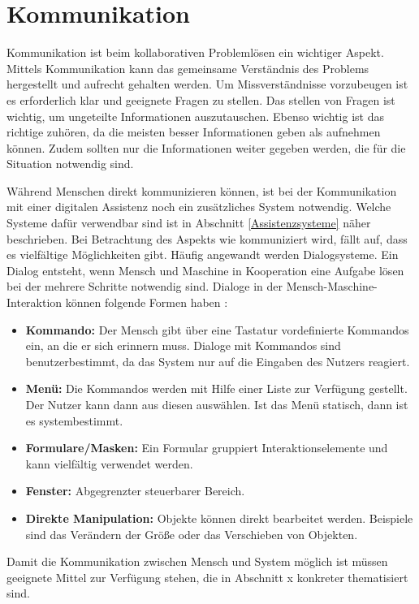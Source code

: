 \section{Kommunikation}
Kommunikation ist beim kollaborativen Problemlösen ein wichtiger Aspekt. Mittels Kommunikation kann das gemeinsame Verständnis des Problems hergestellt und aufrecht gehalten werden. Um Missverständnisse vorzubeugen ist es erforderlich klar und geeignete Fragen zu stellen. Das stellen von Fragen ist wichtig, um ungeteilte Informationen auszutauschen. Ebenso wichtig ist das richtige zuhören, da die meisten besser Informationen geben als aufnehmen können. Zudem sollten nur die Informationen weiter gegeben werden, die für die Situation notwendig sind. \cite{Rohner2016}

Während Menschen direkt kommunizieren können, ist bei der Kommunikation mit einer digitalen Assistenz noch ein zusätzliches System notwendig. Welche Systeme dafür verwendbar sind ist in Abschnitt \ref{Assistenzsysteme} näher beschrieben. Bei Betrachtung des Aspekts wie kommuniziert wird, fällt auf, dass es vielfältige Möglichkeiten gibt. Häufig angewandt werden Dialogsysteme. Ein Dialog entsteht, wenn Mensch und Maschine in Kooperation eine Aufgabe lösen bei der mehrere Schritte notwendig sind. Dialoge in der Mensch-Maschine-Interaktion können folgende Formen haben \cite{Heinecke2012}:
\begin{itemize}
\item \textbf{Kommando:} Der Mensch gibt über eine Tastatur vordefinierte Kommandos ein, an die er sich erinnern muss. Dialoge mit Kommandos sind benutzerbestimmt, da das System nur auf die Eingaben des Nutzers reagiert.
\item \textbf{Menü:} Die Kommandos werden mit Hilfe einer Liste zur Verfügung gestellt. Der Nutzer kann dann aus diesen auswählen. Ist das Menü statisch, dann ist es systembestimmt.
\item \textbf{Formulare/Masken:} Ein Formular gruppiert Interaktionselemente und kann vielfältig verwendet werden.
\item \textbf{Fenster:} Abgegrenzter steuerbarer Bereich.
\item \textbf{Direkte Manipulation:} Objekte können direkt bearbeitet werden. Beispiele sind das Verändern der Größe oder das Verschieben von Objekten.
\end{itemize}
Damit die Kommunikation zwischen Mensch und System möglich ist müssen geeignete Mittel zur Verfügung stehen, die in Abschnitt x konkreter thematisiert sind.

